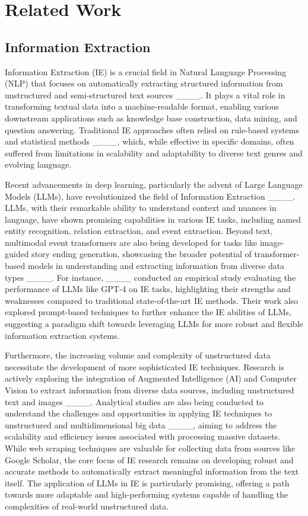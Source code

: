 \section{Related Work}
\subsection{Information Extraction}

Information Extraction (IE) is a crucial field in Natural Language Processing (NLP) that focuses on automatically extracting structured information from unstructured and semi-structured text sources ____. It plays a vital role in transforming textual data into a machine-readable format, enabling various downstream applications such as knowledge base construction, data mining, and question answering. Traditional IE approaches often relied on rule-based systems and statistical methods ____, which, while effective in specific domains, often suffered from limitations in scalability and adaptability to diverse text genres and evolving language.

Recent advancements in deep learning, particularly the advent of Large Language Models (LLMs), have revolutionized the field of Information Extraction ____. LLMs, with their remarkable ability to understand context and nuances in language, have shown promising capabilities in various IE tasks, including named entity recognition, relation extraction, and event extraction.  Beyond text, multimodal event transformers are also being developed for tasks like image-guided story ending generation, showcasing the broader potential of transformer-based models in understanding and extracting information from diverse data types ____. For instance, ____ conducted an empirical study evaluating the performance of LLMs like GPT-4 on IE tasks, highlighting their strengths and weaknesses compared to traditional state-of-the-art IE methods. Their work also explored prompt-based techniques to further enhance the IE abilities of LLMs, suggesting a paradigm shift towards leveraging LLMs for more robust and flexible information extraction systems.

Furthermore, the increasing volume and complexity of unstructured data necessitate the development of more sophisticated IE techniques. Research is actively exploring the integration of Augmented Intelligence (AI) and Computer Vision to extract information from diverse data sources, including unstructured text and images ____. Analytical studies are also being conducted to understand the challenges and opportunities in applying IE techniques to unstructured and multidimensional big data ____, aiming to address the scalability and efficiency issues associated with processing massive datasets. While web scraping techniques are valuable for collecting data from sources like Google Scholar, the core focus of IE research remains on developing robust and accurate methods to automatically extract meaningful information from the text itself. The application of LLMs in IE is particularly promising, offering a path towards more adaptable and high-performing systems capable of handling the complexities of real-world unstructured data.

